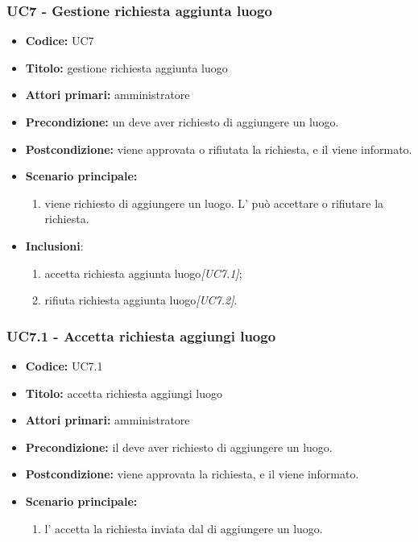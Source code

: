 \documentclass[casi-duso]{subfiles}
\begin{document}
\subsubsection{UC7 - Gestione richiesta aggiunta luogo}
\label{subsub:UC7}
\begin{itemize}
  \item \textbf{Codice:} UC7
  \item \textbf{Titolo:} gestione richiesta aggiunta luogo
  \item \textbf{Attori primari:} amministratore
  \item \textbf{Precondizione:} un  deve aver richiesto di aggiungere un luogo.
  \item \textbf{Postcondizione:} viene approvata o rifiutata la richiesta, e il  viene informato.
  \item \textbf{Scenario principale:} 
  \begin{enumerate}
    \item viene richiesto di aggiungere un luogo. L' può accettare o rifiutare la richiesta.
  \end{enumerate}
  \item \textbf{Inclusioni}:
  \begin{enumerate}
    \item accetta richiesta aggiunta luogo\emph{[UC7.1]};
    \item rifiuta richiesta aggiunta luogo\emph{[UC7.2]}.
  \end{enumerate}
\end{itemize}

\subsubsection{UC7.1 - Accetta richiesta aggiungi luogo}
\label{subsub:UC7.1}
\begin{itemize}
  \item \textbf{Codice:} UC7.1
  \item \textbf{Titolo:} accetta richiesta aggiungi luogo
  \item \textbf{Attori primari:} amministratore
  \item \textbf{Precondizione:} il  deve aver richiesto di aggiungere un luogo.
  \item \textbf{Postcondizione:} viene approvata la richiesta, e il  viene informato.
  \item \textbf{Scenario principale:} 
  \begin{enumerate}
    \item  l' accetta la richiesta inviata dal  di aggiungere un luogo.
  \end{enumerate}
\end{itemize}
\end{document}
